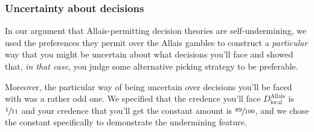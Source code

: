 \documentclass[a4paper,final]{article}
\newcommand{\todoold}[2][]{\todo[backgroundcolor=white,bordercolor=orange!10,linecolor=gray!10, #1,caption={},textcolor=gray]{Pre-rev: #2}}
\newcommand{\todooldinfo}[2][]{\todoold[#1]{#2}}
\renewcommand{\color}[1]{}
\newenvironment{CCM rewritten}
{\begingroup\color{blue}} %
{\endgroup}              %
\begin{document}
%
%


\subsubsection{Uncertainty about decisions}\label{sect:reu:other mu}

In our argument that Allais-permitting decision theories are self-undermining, we used the preferences they permit over the Allais gambles to construct a \emph{particular} way that you might be uncertain about what decisions you'll face and showed that, \emph{in that case}, you judge some alternative picking strategy to be preferable. 



Moreover, the particular way of being uncertain over decisions you'll be faced with was a rather odd one. We specified that the credence you'll face $D^{\mathrm{Allais}}_{\mathrm{local}}$ is $\sfrac{1}{11}$ and your credence that you'll get the constant amount is $\sfrac{89}{100}$, and we chose the constant specifically to demonstrate the undermining feature. 
	
\end{document}
